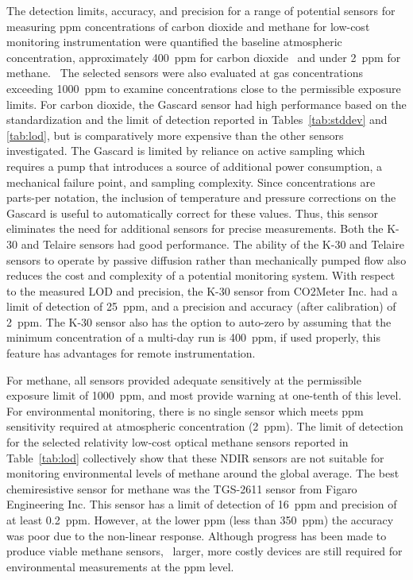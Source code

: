 \documentclass[times]{joehreview}
\begin{document}
	The detection limits, accuracy, and precision for a range of potential sensors for measuring ppm concentrations of carbon dioxide and methane for low-cost monitoring instrumentation were quantified the baseline atmospheric concentration, approximately 400~ppm for carbon dioxide~\cite{blasing_recent_2016,dlugokencky_trends_2016} and under 2~ppm for methane.~\cite{turner_large_2016,bamberger_spatial_2014,dlugokencky_trends_2016-1}  The selected sensors were also evaluated at gas concentrations exceeding 1000~ppm to examine concentrations close to the permissible exposure limits.  For carbon dioxide, the Gascard sensor had high performance based on the standardization and the limit of detection reported in Tables~\ref{tab:stddev} and \ref{tab:lod}, but is comparatively more expensive than the other sensors investigated.  The Gascard is limited by reliance on active sampling which requires a pump that introduces a source of additional power consumption, a mechanical failure point, and sampling complexity.  Since concentrations are parts-per notation, the inclusion of temperature and pressure corrections on the Gascard is useful to automatically correct for these values.  Thus, this sensor eliminates the need for additional sensors for precise measurements.   Both the K-30 and Telaire sensors had good performance.  The ability of the K-30 and Telaire sensors to operate by passive diffusion rather than mechanically pumped flow also reduces the cost and complexity of a potential monitoring system.  With respect to the measured LOD and precision, the K-30 sensor from CO2Meter Inc. had a limit of detection of 25~ppm, and a precision and accuracy (after calibration) of 2~ppm. The K-30 sensor also has the option to auto-zero by assuming that the minimum concentration of a multi-day run is 400~ppm, if used properly, this feature has advantages for remote instrumentation.
	
	For methane, all sensors provided adequate sensitively at the permissible exposure limit of 1000~ppm, and most provide warning at one-tenth of this level.  For environmental monitoring, there is no single sensor which meets ppm sensitivity required at atmospheric concentration (2~ppm).  The limit of detection for the selected relativity low-cost optical methane sensors reported in Table~\ref{tab:lod} collectively show that these NDIR sensors are not suitable for monitoring environmental levels of methane around the global average.  The best chemiresistive sensor for methane was the TGS-2611 sensor from Figaro Engineering Inc.  This sensor has a limit of detection of 16~ppm and precision of at least 0.2~ppm.  However, at the lower ppm (less than 350~ppm) the accuracy was poor due to the non-linear response.  Although progress has been made to produce viable methane sensors,~\cite{zhu_one_2012} larger, more costly devices are still required for environmental measurements at the ppm level.
	
\end{document}
